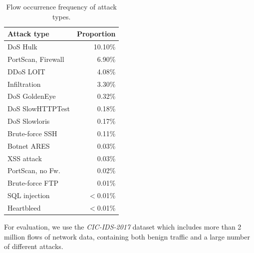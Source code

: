 \documentclass[conference]{IEEEtran}
\begin{document}
\begin{table}[b]
\caption{Flow occurrence frequency of attack types.}
\label{tab:occurrence}
\centering
\begin{tabular}{l r}
\toprule
Attack type & \hspace*{-4mm}Proportion \\ \midrule
DoS Hulk	&	10.10\%	\\
PortScan, Firewall	&	6.90\%	\\
DDoS LOIT	&	4.08\%	\\
Infiltration	&	3.30\%	\\
DoS GoldenEye	&	0.32\%	\\
DoS SlowHTTPTest	&	0.18\%	\\
DoS Slowloris	&	0.17\%	\\
Brute-force SSH	&	0.11\%	\\
Botnet ARES	&	0.03\%	\\
XSS attack	&	0.03\%	\\
PortScan, no Fw.	&	0.02\%	\\
Brute-force FTP	&	0.01\%	\\
SQL injection	&	$<$0.01\%	\\
Heartbleed	&	$<$0.01\%	\\
\bottomrule
\end{tabular}
\end{table}






For evaluation, we use the \textit{CIC-IDS-2017} \cite{sharafaldin_toward_2018} dataset which includes more than 2 million flows of network data, containing both benign traffic and a large number of different attacks. 
\end{document}
